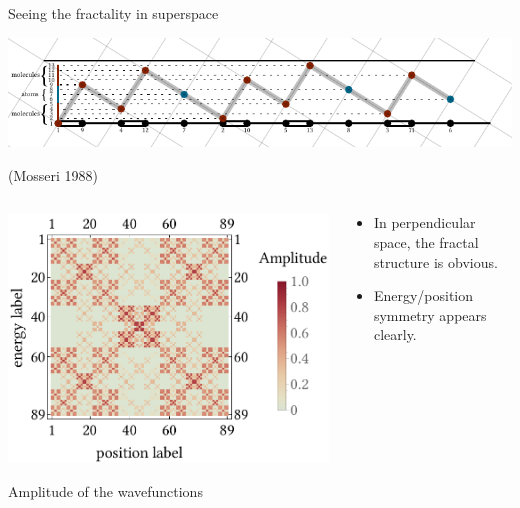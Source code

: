 \documentclass[xcolor=x11names,compress,professionalfonts]{beamer}
\renewcommand{\(}{\begin{columns}}
\renewcommand{\)}{\end{columns}}
\newcommand{\<}[1]{\begin{column}{#1}}
\renewcommand{\>}{\end{column}}
\begin{document}
\begin{frame}{Seeing the fractality in superspace}
		{\centering
		\includegraphics[scale=.85]{inclined_cut_and_project.pdf}
		
		}
		
		\begin{flushright}
		(Mosseri 1988)
		\end{flushright}
		
		\begin{columns}
	\begin{column}{7cm}
		\centering
		\includegraphics[scale=.4]{ldos_reordered.pdf}
		
		\scriptsize{Amplitude of the wavefunctions}	
	\end{column}
	\begin{column}{6cm}
		\begin{itemize}
			\item In perpendicular space, the fractal structure is obvious.
			\item Energy/position symmetry appears clearly.
		\end{itemize}
	\end{column}
\end{columns}
		
\end{frame}
\end{document}
